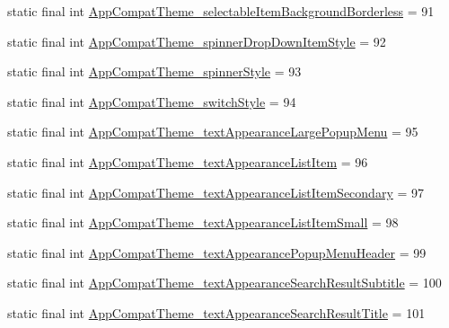 \begin{DoxyCompactItemize}
\item 
static final int \mbox{\hyperlink{classandroid_1_1support_1_1v7_1_1appcompat_1_1_r_1_1styleable_ac11572c84c328c4715eb1b8b1f549b6a}{App\+Compat\+Theme\+\_\+selectable\+Item\+Background\+Borderless}} = 91
\item 
static final int \mbox{\hyperlink{classandroid_1_1support_1_1v7_1_1appcompat_1_1_r_1_1styleable_aa05b8bf874f1bbfdcfd00c7f5c3c843a}{App\+Compat\+Theme\+\_\+spinner\+Drop\+Down\+Item\+Style}} = 92
\item 
static final int \mbox{\hyperlink{classandroid_1_1support_1_1v7_1_1appcompat_1_1_r_1_1styleable_ad820426da217795f82a82162f3e7d97a}{App\+Compat\+Theme\+\_\+spinner\+Style}} = 93
\item 
static final int \mbox{\hyperlink{classandroid_1_1support_1_1v7_1_1appcompat_1_1_r_1_1styleable_a75c82320cf03027b5a646781520a487d}{App\+Compat\+Theme\+\_\+switch\+Style}} = 94
\item 
static final int \mbox{\hyperlink{classandroid_1_1support_1_1v7_1_1appcompat_1_1_r_1_1styleable_af281c6fbf8f934f14111b4c519715cdf}{App\+Compat\+Theme\+\_\+text\+Appearance\+Large\+Popup\+Menu}} = 95
\item 
static final int \mbox{\hyperlink{classandroid_1_1support_1_1v7_1_1appcompat_1_1_r_1_1styleable_ad278dc07bb9fc2725bb8f64aa96e715a}{App\+Compat\+Theme\+\_\+text\+Appearance\+List\+Item}} = 96
\item 
static final int \mbox{\hyperlink{classandroid_1_1support_1_1v7_1_1appcompat_1_1_r_1_1styleable_a7cf31b6e186e846267baf95bae5d2a86}{App\+Compat\+Theme\+\_\+text\+Appearance\+List\+Item\+Secondary}} = 97
\item 
static final int \mbox{\hyperlink{classandroid_1_1support_1_1v7_1_1appcompat_1_1_r_1_1styleable_a12218feaabf910cc058fc5e7a3cc7c6a}{App\+Compat\+Theme\+\_\+text\+Appearance\+List\+Item\+Small}} = 98
\item 
static final int \mbox{\hyperlink{classandroid_1_1support_1_1v7_1_1appcompat_1_1_r_1_1styleable_a56c4dbb25b7898571e573725449d46cc}{App\+Compat\+Theme\+\_\+text\+Appearance\+Popup\+Menu\+Header}} = 99
\item 
static final int \mbox{\hyperlink{classandroid_1_1support_1_1v7_1_1appcompat_1_1_r_1_1styleable_aec08431e71de4105e4876aeaed08b1a7}{App\+Compat\+Theme\+\_\+text\+Appearance\+Search\+Result\+Subtitle}} = 100
\item 
static final int \mbox{\hyperlink{classandroid_1_1support_1_1v7_1_1appcompat_1_1_r_1_1styleable_a34b89646184f0d996fbc0e3dcb2f4d4c}{App\+Compat\+Theme\+\_\+text\+Appearance\+Search\+Result\+Title}} = 101

\end{DoxyCompactItemize}
